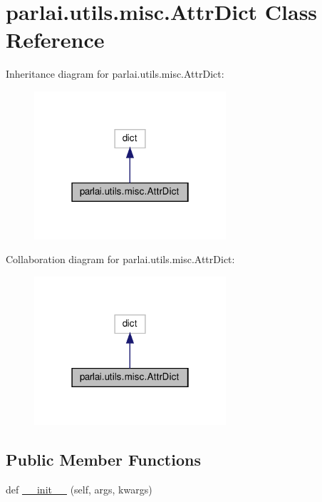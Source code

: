 \hypertarget{classparlai_1_1utils_1_1misc_1_1AttrDict}{}\section{parlai.\+utils.\+misc.\+Attr\+Dict Class Reference}
\label{classparlai_1_1utils_1_1misc_1_1AttrDict}


Inheritance diagram for parlai.\+utils.\+misc.\+Attr\+Dict\+:
\nopagebreak
\begin{figure}[H]
\begin{center}
\leavevmode
\includegraphics[width=202pt]{classparlai_1_1utils_1_1misc_1_1AttrDict__inherit__graph}
\end{center}
\end{figure}


Collaboration diagram for parlai.\+utils.\+misc.\+Attr\+Dict\+:
\nopagebreak
\begin{figure}[H]
\begin{center}
\leavevmode
\includegraphics[width=202pt]{classparlai_1_1utils_1_1misc_1_1AttrDict__coll__graph}
\end{center}
\end{figure}
\subsection*{Public Member Functions}
\begin{DoxyCompactItemize}
\item 
def \hyperlink{classparlai_1_1utils_1_1misc_1_1AttrDict_a8a0ed33202adee184fc7ec06cf89a7ba}{\+\_\+\+\_\+init\+\_\+\+\_\+} (self, args, kwargs)
\end{DoxyCompactItemize}


